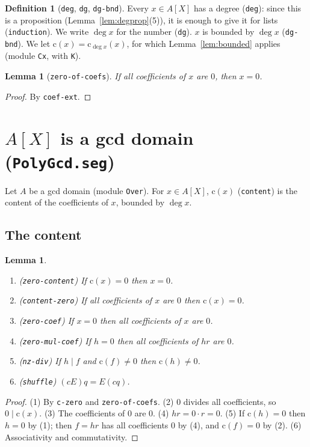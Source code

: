 \documentclass[11pt]{amsart}
\newtheorem{lemma}[theorem]{Lemma}
\theoremstyle{definition}
\newtheorem{definition}[theorem]{Definition}
\theoremstyle{remark}
\newcommand{\nm}[1]{\textup{\texttt{#1}}}
\newcommand{\file}[1]{\textup{\texttt{#1.seg}}}
\newcommand{\cont}{\mathrm{c}}
\begin{document}
\begin{definition}[\nm{deg}, \nm{dg}, \nm{dg-bnd}]
Every $x\in A[X]$ has a degree (\nm{deg}): since this is a proposition
(Lemma~\ref{lem:degprop}(5)), it is enough to give it for lists
(\nm{induction}). We write $\deg x$ for the number (\nm{dg}). $x$ is
bounded by $\deg x$ (\nm{dg-bnd}). We let $\cont(x) = \cont_{\deg x}(x)$,
for which Lemma~\ref{lem:bounded} applies (module \nm{Cx}, with \nm{K}).
\end{definition}

\begin{lemma}[\nm{zero-of-coefs}]
If all coefficients of $x$ are $0$, then $x = 0$.
\end{lemma}
\begin{proof}
By \nm{coef-ext}.
\end{proof}

\section{$A[X]$ is a gcd domain (\file{PolyGcd})}

Let $A$ be a gcd domain (module \nm{Over}). For $x\in A[X]$, $\cont(x)$
(\nm{content}) is the content of the coefficients of $x$, bounded by
$\deg x$.

\subsection{The content}

\begin{lemma}\label{lem:contzero}
\begin{enumerate}
\item (\nm{zero-content}) If $\cont(x) = 0$ then $x=0$.
\item (\nm{content-zero}) If all coefficients of $x$ are $0$ then
  $\cont(x)=0$.
\item (\nm{zero-coef}) If $x=0$ then all coefficients of $x$ are $0$.
\item (\nm{zero-mul-coef}) If $h=0$ then all coefficients of $hr$ are
  $0$.
\item (\nm{nz-div}) If $h\mid f$ and $\cont(f)\neq0$ then
  $\cont(h)\neq0$.
\item (\nm{shuffle}) $(cE)q = E(cq)$.
\end{enumerate}
\end{lemma}
\begin{proof}
(1) By \nm{c-zero} and \nm{zero-of-coefs}.
(2) $0$ divides all coefficients, so $0\mid\cont(x)$.
(3) The coefficients of $0$ are $0$.
(4) $hr = 0\cdot r = 0$.
(5) If $\cont(h) = 0$ then $h=0$ by (1); then $f = hr$ has all
coefficients $0$ by (4), and $\cont(f)=0$ by (2).
(6) Associativity and commutativity.
\end{proof}
\end{document}
